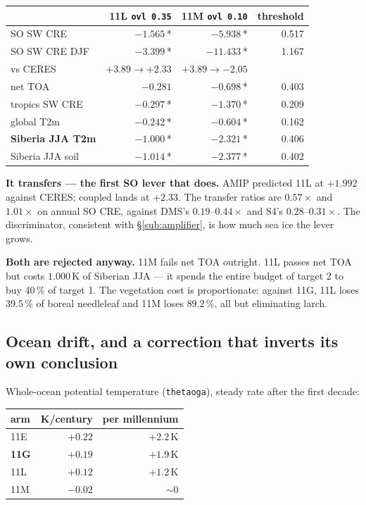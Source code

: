 \documentclass[10pt]{article}
\begin{document}
\begin{center}\small
\begin{tabular}{lrrr}
\toprule
 & \textbf{11L} \texttt{ovl 0.35} & \textbf{11M} \texttt{ovl 0.10} & threshold \\
\midrule
SO SW CRE            & $-1.565$\,* & $-5.938$\,* & 0.517 \\
SO SW CRE DJF        & $-3.399$\,* & $-11.433$\,* & 1.167 \\
vs CERES             & $+3.89\to\mathbf{+2.33}$ & $+3.89\to\mathbf{-2.05}$ & \\
net TOA              & $-0.281$ & $\mathbf{-0.698}$\,* & 0.403 \\
tropics SW CRE       & $-0.297$\,* & $-1.370$\,* & 0.209 \\
global T2m           & $-0.242$\,* & $-0.604$\,* & 0.162 \\
\textbf{Siberia JJA T2m} & $\mathbf{-1.000}$\,* & $\mathbf{-2.321}$\,* & 0.406 \\
Siberia JJA soil     & $-1.014$\,* & $-2.377$\,* & 0.402 \\
\bottomrule
\end{tabular}
\end{center}

\textbf{It transfers --- the first SO lever that does.} AMIP predicted 11L at $+1.992$
against CERES; coupled lands at $+2.33$. The transfer ratios are $0.57\times$ and
$1.01\times$ on annual SO CRE, against DMS's $0.19$--$0.44\times$ and S4's
$0.28$--$0.31\times$. The discriminator, consistent with \S\ref{sub:amplifier}, is how
much sea ice the lever grows.

\textbf{Both are rejected anyway.} 11M fails net TOA outright. 11L passes net TOA but
costs $1.000$\,K of Siberian JJA --- it spends the entire budget of target 2 to buy 40\,\%
of target 1. The vegetation cost is proportionate: against 11G, 11L loses 39.5\,\% of
boreal needleleaf and 11M loses $89.2$\,\%, all but eliminating larch.

\subsection{Ocean drift, and a correction that inverts its own conclusion}\label{sub:r30drift}

Whole-ocean potential temperature (\texttt{thetaoga}), steady rate after the first decade:

\begin{center}\small
\begin{tabular}{lrr}
\toprule
arm & K/century & per millennium \\
\midrule
11E & $+0.22$ & $+2.2$\,K \\
\textbf{11G} & $\mathbf{+0.19}$ & $+1.9$\,K \\
11L & $+0.12$ & $+1.2$\,K \\
11M & $-0.02$ & $\sim 0$ \\
\bottomrule
\end{tabular}
\end{center}
\end{document}
